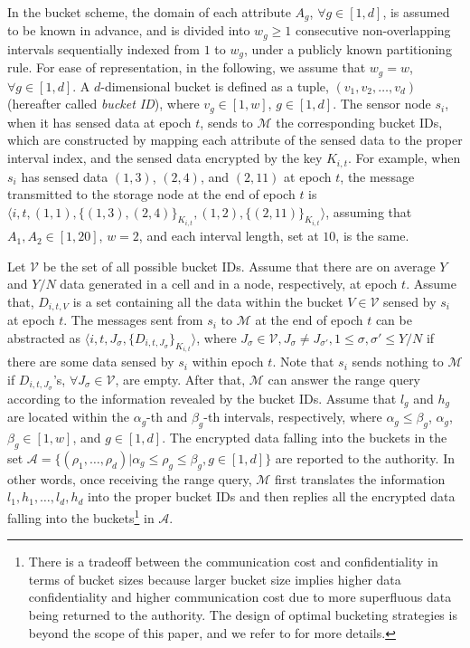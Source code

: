 \documentclass[conference]{IEEEtran}
\begin{document}
In the bucket scheme, the domain of each attribute $A_g$, $\forall g \in [1,d]$, is assumed to be known in advance, and is divided into $w_g\geq 1$ consecutive non-overlapping intervals sequentially indexed from $1$ to $w_g$, under a publicly known partitioning rule. For ease of representation, in the following, we assume that $w_g=w$, $\forall g \in[1,d]$. A $d$-dimensional bucket is defined as a tuple, $(v_1, v_2,\dots, v_d)$ (hereafter called \emph{bucket ID}), where $v_g\in [1,w]$, $g\in [1,d]$. The sensor node $s_i$, when it has sensed data at epoch $t$,  sends to $\mathcal{M}$ the corresponding bucket IDs, which are constructed by mapping each attribute of the sensed data to the proper interval index, and the sensed data encrypted by the key $K_{i,t}$. For example, when $s_i$ has sensed data $(1,3)$, $(2,4)$, and $(2,11)$ at epoch $t$, the message transmitted to the storage node at the end of epoch $t$ is $\langle i,t,(1,1),\{(1,3),(2,4)\}_{K_{i,t}},(1,2),\{(2,11)\}_{K_{i,t}}\rangle$, assuming that $A_1, A_2\in [1,20]$, $w=2$, and each interval length, set at $10$, is the same.

Let $\mathcal{V}$ be the set of all possible bucket IDs. Assume that there are on average $Y$ and $Y/N$ data generated in a cell and in a node, respectively, at epoch $t$. Assume that, $D_{i,t,V}$ is a set containing all the data within the bucket $V\in\mathcal{V}$ sensed by $s_i$ at epoch $t$. The messages sent from $s_i$ to $\mathcal{M}$ at the end of epoch $t$ can be abstracted as $\langle i,t,J_\sigma,\{D_{i,t,J_\sigma}\}_{K_{i,t}}\rangle$, where $J_\sigma\in \mathcal{V}, J_\sigma\neq J_{\sigma'}, 1\leq \sigma,\sigma'\leq Y/N$ if there are some data sensed by $s_i$ within epoch $t$. Note that $s_i$ sends nothing to $\mathcal{M}$ if $D_{i,t,J_\sigma}$'s, $\forall J_{\sigma}\in \mathcal{V}$, are empty. After that, $\mathcal{M}$ can answer the range query according to the information revealed by the bucket IDs. Assume that $l_g$ and $h_g$ are located within the $\alpha_g$-th and $\beta_g$-th intervals, respectively, where $\alpha_g\leq \beta_g$, $\alpha_g$, $\beta_g\in [1,w]$, and $g\in [1,d]$. The encrypted data falling into the buckets in the set $\mathcal{A}=\{(\rho_1,\dots,\rho_d)|\alpha_g \leq \rho_g\leq \beta_g, g\in[1,d]\}$ are reported to the authority. In other words, once receiving the range query, $\mathcal{M}$ first translates the information $l_1, h_1, \dots, l_d, h_d$ into the proper bucket IDs and then replies all the encrypted data falling into the buckets\footnote{There is a tradeoff between the communication cost and confidentiality in terms of bucket sizes because larger bucket size implies higher data confidentiality and higher communication cost due to more superfluous data being returned to the authority. The design of optimal bucketing strategies is beyond the scope of this paper, and we refer to \cite{hilm02,hmt04} for more details.} in $\mathcal{A}$.
\end{document}
